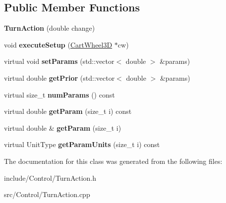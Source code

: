 \subsection*{Public Member Functions}
\begin{DoxyCompactItemize}
\item 
\hypertarget{classCartWheel_1_1TurnAction_ae1dbbe6756274f9985e93f2baa8cb1bb}{
{\bfseries TurnAction} (double change)}
\label{classCartWheel_1_1TurnAction_ae1dbbe6756274f9985e93f2baa8cb1bb}

\item 
\hypertarget{classCartWheel_1_1TurnAction_abfebc60f4069d8c0c21003aa28863b1d}{
void {\bfseries executeSetup} (\hyperlink{classCartWheel_1_1CartWheel3D}{CartWheel3D} $\ast$cw)}
\label{classCartWheel_1_1TurnAction_abfebc60f4069d8c0c21003aa28863b1d}

\item 
\hypertarget{classCartWheel_1_1TurnAction_adabbafb4758153dea0fe0d36ea56ae81}{
virtual void {\bfseries setParams} (std::vector$<$ double $>$ \&params)}
\label{classCartWheel_1_1TurnAction_adabbafb4758153dea0fe0d36ea56ae81}

\item 
\hypertarget{classCartWheel_1_1TurnAction_adc25daf0f341295277db8aa97590c279}{
virtual double {\bfseries getPrior} (std::vector$<$ double $>$ \&params)}
\label{classCartWheel_1_1TurnAction_adc25daf0f341295277db8aa97590c279}

\item 
\hypertarget{classCartWheel_1_1TurnAction_a25b6d0f40fc28ee1d1f1b4512e09ba6c}{
virtual size\_\-t {\bfseries numParams} () const }
\label{classCartWheel_1_1TurnAction_a25b6d0f40fc28ee1d1f1b4512e09ba6c}

\item 
\hypertarget{classCartWheel_1_1TurnAction_a3955c560528ea14efc8a892f41fe0c6e}{
virtual double {\bfseries getParam} (size\_\-t i) const }
\label{classCartWheel_1_1TurnAction_a3955c560528ea14efc8a892f41fe0c6e}

\item 
\hypertarget{classCartWheel_1_1TurnAction_a89eedb33bc24773035ec50d9285b4c5f}{
virtual double \& {\bfseries getParam} (size\_\-t i)}
\label{classCartWheel_1_1TurnAction_a89eedb33bc24773035ec50d9285b4c5f}

\item 
\hypertarget{classCartWheel_1_1TurnAction_a0b32a9dceeee238fce5b7d2743753b13}{
virtual UnitType {\bfseries getParamUnits} (size\_\-t i) const }
\label{classCartWheel_1_1TurnAction_a0b32a9dceeee238fce5b7d2743753b13}

\end{DoxyCompactItemize}


The documentation for this class was generated from the following files:\begin{DoxyCompactItemize}
\item 
include/Control/TurnAction.h\item 
src/Control/TurnAction.cpp\end{DoxyCompactItemize}
